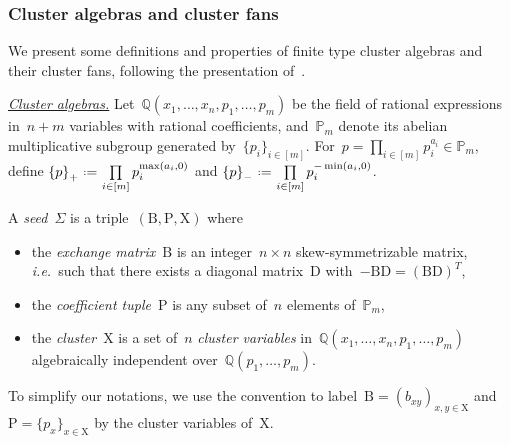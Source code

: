 \documentclass{amsart}
\theoremstyle{definition}
\newcommand{\Q}{\mathbb{Q}} %
\newcommand{\eqdef}{\mbox{\,\raisebox{0.2ex}{\scriptsize\ensuremath{\mathrm:}}\ensuremath{=}\,}} %
\newcommand{\ie}{\textit{i.e.}~} %
\newcommand{\darkblue}{\color{darkblue}} %
\newcommand{\defn}[1]{\textsl{\darkblue #1}} %
\newcommand{\para}[1]{\medskip\noindent\uline{\textit{#1.}}} %
\newcommand{\Trop}[1]{\mathbb{P}_{#1}} %
\newcommand{\positiveExponents}[1]{\left\{#1\right\}_+} %
\newcommand{\negativeExponents}[1]{\left\{#1\right\}_-} %
\newcommand{\seed}{\Sigma} %
\newcommand{\cluster}{\mathrm{X}} %
\newcommand{\coefficients}{\mathrm{P}} %
\newcommand{\B}{\mathrm{B}} %
\newcommand{\D}{\mathrm{D}} %
\begin{document}
\subsubsection{Cluster algebras and cluster fans}

We present some definitions and properties of finite type cluster algebras and their cluster fans, following the presentation of~\cite{HohlwegPilaudStella}.

\para{Cluster algebras}
%
Let~$\Q(x_1, \dots, x_n, p_1, \dots, p_m)$ be the field of rational expressions in~$n+m$ variables with rational coefficients, and~$\Trop{m}$ denote its abelian multiplicative subgroup generated by~$\{p_i\}_{i \in [m]}$.
For~$p = \prod\limits_{i \in [m]} p_i^{a_i} \in \Trop{m}$, define
\(
\positiveExponents{p} \eqdef \prod\limits_{i \in [m]} p_i^{\max(a_i,0)}
\)
and
\(
\negativeExponents{p} \eqdef \prod\limits_{i \in [m]} p_i^{-\min(a_i,0)}
\).

\medskip
A \defn{seed}~$\seed$ is a triple~$(\B, \coefficients, \cluster)$ where
\begin{itemize}
\item the \defn{exchange matrix}~$\B$ is an integer~$n \times n$ skew-symmetrizable matrix, \ie such that there exists a diagonal matrix~$\D$ with~$-\B\D = (\B\D)^T$,
\item the \defn{coefficient tuple}~$\coefficients$ is any subset of~$n$ elements of~$\Trop{m}$,
\item the \defn{cluster}~$\cluster$ is a set of~$n$ \defn{cluster variables} in~$\Q(x_1, \dots, x_n, p_1, \dots, p_m)$ algebraically independent over~$\Q(p_1, \dots, p_m)$.
\end{itemize}
To simplify our notations, we use the convention to label~$\B = (b_{xy})_{x,y \in \cluster}$ and~$\coefficients = \{p_x\}_{x \in \cluster}$ by the cluster variables of~$\cluster$.
\end{document}
